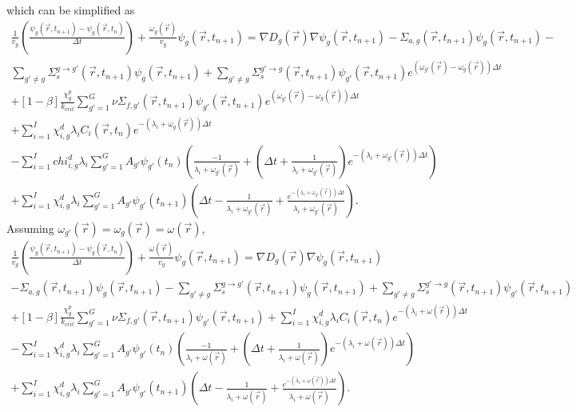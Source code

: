 \documentclass[12pt]{report}
\begin{document}
	which can be simplified as
	\begin{eqnarray}
	\frac{1}{v_g} \left(\frac{\psi_g(\vec{r},t_{n+1}) - \psi_g(\vec{r},t_{n})}{\Delta t} \right) + \frac{\omega_g(\vec{r})}{v_g} \psi_g(\vec{r},t_{n+1})  = \nabla D_g(\vec{r}) \nabla \psi_g(\vec{r},t_{n+1}) - \Sigma_{a,g}(\vec{r},t_{n+1}) \psi_g(\vec{r},t_{n+1}) -  \nonumber \\ \sum_{g'\neq g} \Sigma_{s}^{g\rightarrow g'} (\vec{r},t_{n+1}) \psi_g(\vec{r},t_{n+1}) + \sum_{g' \neq g} \Sigma_{s}^{g'\rightarrow g} (\vec{r},t_{n+1}) \psi_{g'}(\vec{r},t_{n+1}) e^{\left(\omega_{g'}(\vec{r}) - \omega_{g}(\vec{r}) \right) \Delta t} \nonumber \\
	+ \left[ 1- \beta \right] \frac{\chi_g^p}{k_{crit}} \sum_{g'=1}^{G} \nu \Sigma_{f,g'}(\vec{r},t_{n+1}) \psi_{g'}(\vec{r},t_{n+1}) e^{\left(\omega_{g'}(\vec{r}) - \omega_{g}(\vec{r}) \right) \Delta t} \nonumber \\ +  \sum_{i=1}^{I} \chi_{i,g}^d \lambda_i C_i(\vec{r},t_{n}) e^{-\left(\lambda_i + \omega_g(\vec{r})\right) \Delta t} \nonumber \\
	- \sum_{i=1}^{I} chi_{i,g}^d \lambda_i \sum_{g'=1}^{G} A_{g'} \psi_{g'}(t_n) \left( \frac{-1}{\lambda_i + \omega_{g'}(\vec{r})} + \left(\Delta t + \frac{1}{\lambda_i + \omega_{g'}(\vec{r})} \right)e^{-\left(\lambda_i + \omega_{g'}(\vec{r}) \right) \Delta t} \right) \nonumber \\
	+ \sum_{i=1}^{I} \chi_{i,g}^d \lambda_i \sum_{g'=1}^{G} A_{g'} \psi_{g'}(t_{n+1}) \left( \Delta t - \frac{1}{\lambda_i + \omega_{g'}(\vec{r})} + \frac{e^{-\left( \lambda_i + \omega_{g'}(\vec{r}) \right) \Delta t}}{\lambda_i + \omega_{g'}(\vec{r})} \right)
	\nonumber.
	\end{eqnarray}
	Assuming $\omega_{g'}(\vec{r}) = \omega_g(\vec{r}) = \omega(\vec{r})$,
	\begin{eqnarray}
	\frac{1}{v_g} \left(\frac{\psi_g(\vec{r},t_{n+1}) - \psi_g(\vec{r},t_{n})}{\Delta t} \right) + \frac{\omega(\vec{r})}{v_g} \psi_g(\vec{r},t_{n+1})  = \nabla D_g(\vec{r}) \nabla \psi_g(\vec{r},t_{n+1}) \nonumber \\ - \Sigma_{a,g}(\vec{r},t_{n+1}) \psi_g(\vec{r},t_{n+1}) -   \sum_{g'\neq g} \Sigma_{s}^{g\rightarrow g'} (\vec{r},t_{n+1}) \psi_g(\vec{r},t_{n+1}) + \sum_{g' \neq g} \Sigma_{s}^{g'\rightarrow g} (\vec{r},t_{n+1}) \psi_{g'}(\vec{r},t_{n+1}) \nonumber \\
	+ \left[ 1- \beta \right] \frac{\chi_g^p}{k_{crit}} \sum_{g'=1}^{G} \nu \Sigma_{f,g'}(\vec{r},t_{n+1}) \psi_{g'}(\vec{r},t_{n+1})  +  \sum_{i=1}^{I} \chi_{i,g}^d \lambda_i C_i(\vec{r},t_{n}) e^{-\left(\lambda_i + \omega(\vec{r})\right) \Delta t} \nonumber \\
	- \sum_{i=1}^{I} \chi_{i,g}^d \lambda_i \sum_{g'=1}^{G} A_{g'} \psi_{g'}(t_n) \left( \frac{-1}{\lambda_i + \omega(\vec{r})} + \left(\Delta t + \frac{1}{\lambda_i + \omega(\vec{r})} \right)e^{-\left(\lambda_i + \omega(\vec{r}) \right) \Delta t} \right) \nonumber \\
	+ \sum_{i=1}^{I} \chi_{i,g}^d \lambda_i \sum_{g'=1}^{G} A_{g'} \psi_{g'}(t_{n+1}) \left( \Delta t - \frac{1}{\lambda_i + \omega(\vec{r})} + \frac{e^{-\left( \lambda_i + \omega(\vec{r}) \right) \Delta t}}{\lambda_i + \omega(\vec{r})}\right)
	\nonumber.
	\end{eqnarray}
\end{document}

